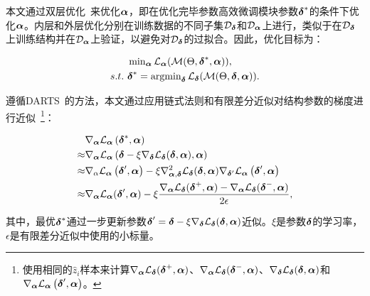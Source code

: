 本文通过双层优化~\cite{anandalingam1992hierarchical, liu2018darts}来优化$\boldsymbol{\alpha}$，即在优化完毕参数高效微调模块参数$\boldsymbol{\delta}^*$的条件下优化$\boldsymbol{\alpha}$。内层和外层优化分别在训练数据的不同子集$\mathcal{D}_{\boldsymbol{\delta}}$和$\mathcal{D}_{\boldsymbol{\alpha}}$上进行，类似于在$\mathcal{D}_{\boldsymbol{\delta}}$上训练结构并在$\mathcal{D}_{\boldsymbol{\alpha}}$上验证，以避免对$\mathcal{D}_{\boldsymbol{\delta}}$的过拟合。因此，优化目标为：

{%
\begin{align}
    &\operatorname{min}_{\boldsymbol{\alpha}}\mathcal{L}_{\boldsymbol{\alpha}}(\mathcal{M}(\Theta, \boldsymbol{\delta}^*, \boldsymbol{\alpha})), \\
       s.t.\ & \boldsymbol{\delta}^* = \operatorname{argmin}_{\boldsymbol{\delta}} \mathcal{L}_{\boldsymbol{\delta}}( \mathcal{M}(\Theta,\boldsymbol{\delta}, \boldsymbol{\alpha})).
    \end{align}
    }
    
    遵循DARTS~\cite{liu2018darts}的方法，本文通过应用链式法则和有限差分近似对结构参数的梯度进行近似~\footnote{使用相同的$\hat{z}_i$样本来计算$\nabla_{\boldsymbol{\alpha}}\mathcal{L}_{\boldsymbol{\delta}}(\boldsymbol{\delta}^+,\boldsymbol{\alpha})$、$\nabla_{\boldsymbol{\alpha}}\mathcal{L}_{\boldsymbol{\delta}}(\boldsymbol{\delta}^-,\boldsymbol{\alpha})$、$\nabla_{\boldsymbol{\delta}}\mathcal{L}_{\boldsymbol{\delta}}(\boldsymbol{\delta},\boldsymbol{\alpha})$和$\nabla_{\boldsymbol{\alpha}} \mathcal{L}_{\boldsymbol{\alpha}}\left(\boldsymbol{\delta}^\prime, \boldsymbol{\alpha}\right)$。}：
    
    {%
    \begin{align}
    & \nabla_{\boldsymbol{\alpha}} \mathcal{L}_{\boldsymbol{\alpha}}\left(\boldsymbol{\delta}^*, \boldsymbol{\alpha}\right) \\
    \approx & \nabla_{\boldsymbol{\alpha}} \mathcal{L}_{\boldsymbol{\alpha}}\left(\boldsymbol{\delta} - \xi \nabla_{\boldsymbol{\delta}}\mathcal{L}_{\boldsymbol{\delta}}(\boldsymbol{\delta}, \boldsymbol{\alpha}), \boldsymbol{\alpha}\right) \\
    \approx & \nabla_{\alpha} \mathcal{L}_{\boldsymbol{\alpha}}\left(\boldsymbol{\delta}^{\prime}, \boldsymbol{\alpha}\right)-\xi \nabla_{\boldsymbol{\alpha}, \boldsymbol{\delta}}^{2} \mathcal{L}_{\boldsymbol{\delta}}(\boldsymbol{\delta}, \boldsymbol{\alpha}) \nabla_{\boldsymbol{\delta}^{\prime}} \mathcal{L}_{\boldsymbol{\alpha}}\left(\boldsymbol{\delta}^{\prime}, \boldsymbol{\alpha}\right)
    \label{equ:dartsapprox3}\\
    \approx & \nabla_{\boldsymbol{\alpha}} \mathcal{L}_{\boldsymbol{\alpha}}(\boldsymbol{\delta}^\prime, \boldsymbol{\alpha})- \xi\frac{\nabla_{\boldsymbol{\alpha}}\mathcal{L_{\boldsymbol{\delta}}(\boldsymbol{\delta}^+,\boldsymbol{\alpha}) - \nabla_{\boldsymbol{\alpha}}L_{\boldsymbol{\delta}}(\boldsymbol{\delta}^-,\boldsymbol{\alpha})}}{2\epsilon}, \label{equ:archigrad}
    \end{align}
    }
    
    其中，最优$\boldsymbol{\delta}^*$通过一步更新参数$\boldsymbol{\delta}^\prime = \boldsymbol{\delta} - \xi\nabla_{\boldsymbol{\delta}}\mathcal{L}_{\boldsymbol{\delta}}(\boldsymbol{\delta}, \boldsymbol{\alpha})$近似。$\xi$是参数$\boldsymbol{\delta}$的学习率，$\epsilon$是有限差分近似中使用的小标量。




